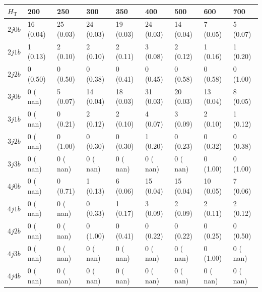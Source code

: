 \begin{table}[h]
\small
\begin{tabular}{lllllllll}
\hline \hline
$H_\textrm{T}$                 &     200 &            250 &             300&             350&             400&             500&             600&             700  \\\hline\hline
$2j 0b$&          16 (0.04)&	   25 (0.03)&	   24 (0.03)&	   19 (0.03)&	   24 (0.03)&	   14 (0.04)&	    7 (0.05)&	    5 (0.07) \\\hline
$2j 1b$&           1 (0.13)&	    2 (0.10)&	    2 (0.10)&	    2 (0.11)&	    3 (0.08)&	    2 (0.12)&	    1 (0.16)&	    1 (0.20) \\\hline
$2j 2b$&           0 (0.50)&	    0 (0.50)&	    0 (0.38)&	    0 (0.41)&	    0 (0.45)&	    0 (0.58)&	    0 (0.58)&	    0 (1.00) \\\hline
$3j 0b$&           0 ( nan)&	    5 (0.07)&	   14 (0.04)&	   18 (0.03)&	   31 (0.03)&	   20 (0.03)&	   13 (0.04)&	    8 (0.05) \\\hline
$3j 1b$&           0 ( nan)&	    0 (0.21)&	    2 (0.12)&	    2 (0.10)&	    4 (0.07)&	    3 (0.09)&	    2 (0.10)&	    1 (0.12) \\\hline
$3j 2b$&           0 ( nan)&	    0 (1.00)&	    0 (0.30)&	    0 (0.30)&	    1 (0.20)&	    0 (0.23)&	    0 (0.32)&	    0 (0.38) \\\hline
$3j 3b$&           0 ( nan)&	    0 ( nan)&	    0 ( nan)&	    0 ( nan)&	    0 ( nan)&	    0 ( nan)&	    0 (1.00)&	    0 (1.00) \\\hline
$4j 0b$&           0 ( nan)&	    0 (0.71)&	    1 (0.13)&	    6 (0.06)&	   15 (0.04)&	   15 (0.04)&	   10 (0.05)&	    7 (0.06) \\\hline
$4j 1b$&           0 ( nan)&	    0 ( nan)&	    0 (0.33)&	    1 (0.17)&	    3 (0.09)&	    2 (0.09)&	    2 (0.11)&	    2 (0.12) \\\hline
$4j 2b$&           0 ( nan)&	    0 ( nan)&	    0 (1.00)&	    0 (0.41)&	    0 (0.22)&	    0 (0.22)&	    0 (0.25)&	    0 (0.50) \\\hline
$4j 3b$&           0 ( nan)&	    0 ( nan)&	    0 ( nan)&	    0 ( nan)&	    0 ( nan)&	    0 ( nan)&	    0 (1.00)&	    0 ( nan) \\\hline
$4j 4b$&           0 ( nan)&	    0 ( nan)&	    0 ( nan)&	    0 ( nan)&	    0 ( nan)&	    0 ( nan)&	    0 ( nan)&	    0 ( nan) \\\hline
\hline
\end{tabular}
\label{tab:sig_yields_AVDM_nom}
\end{table}

